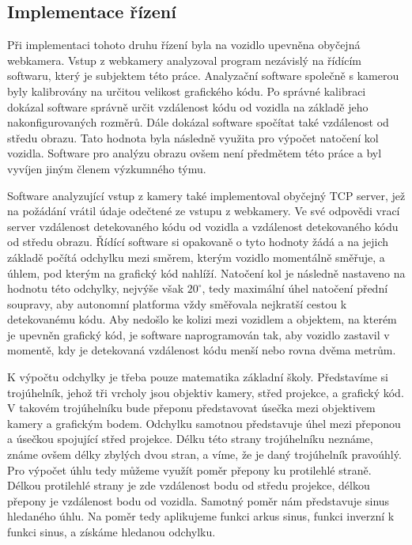 \documentclass[czech, bachelor]{diploma}
\begin{document}
\subsection{Implementace řízení}

Při implementaci tohoto druhu řízení byla na vozidlo upevněna obyčejná webkamera. Vstup z webkamery analyzoval program nezávislý
na řídícím softwaru, který je subjektem této práce. Analyzační software společně s kamerou byly kalibrovány na určitou velikost
grafického kódu. Po správné kalibraci dokázal software správně určit vzdálenost kódu od vozidla na základě jeho nakonfigurovaných
rozměrů. Dále dokázal software spočítat také vzdálenost od středu obrazu. Tato hodnota byla následně využita pro výpočet natočení
kol vozidla. Software pro analýzu obrazu ovšem není předmětem této práce a byl vyvíjen jiným členem výzkumného týmu.

Software analyzující vstup z kamery také implementoval obyčejný TCP server, jež na požádání vrátil údaje odečtené ze vstupu 
z webkamery. Ve své odpovědi vrací server vzdálenost detekovaného kódu od vozidla a vzdálenost detekovaného kódu od středu obrazu.
Řídící software si opakovaně o tyto hodnoty žádá a na jejich základě počítá odchylku mezi směrem, kterým vozidlo momentálně 
směřuje, a úhlem, pod kterým na grafický kód nahlíží. Natočení kol je následně nastaveno na hodnotu této odchylky, nejvýše však
$20^{\circ}$, tedy maximální úhel natočení přední soupravy, aby autonomní platforma vždy směřovala nejkratší cestou k detekovanému
kódu. Aby nedošlo ke kolizi mezi vozidlem a objektem, na kterém je upevněn grafický kód, je software naprogramován tak, aby 
vozidlo zastavil v momentě, kdy je detekovaná vzdálenost kódu menší nebo rovna dvěma metrům.

K výpočtu odchylky je třeba pouze matematika základní školy. Představíme si trojúhelník, jehož tři vrcholy jsou objektiv kamery, 
střed projekce, a grafický kód. V takovém trojúhelníku bude přeponu představovat úsečka mezi objektivem kamery a grafickým bodem.
Odchylku samotnou představuje úhel mezi přeponou a úsečkou spojující střed projekce. Délku této strany trojúhelníku neznáme, známe
ovšem délky zbylých dvou stran, a víme, že je daný trojúhelník pravoúhlý. Pro výpočet úhlu tedy můžeme využít poměr přepony ku 
protilehlé straně. Délkou protilehlé strany je zde vzdálenost bodu od středu projekce, délkou přepony je vzdálenost bodu 
od vozidla. Samotný poměr nám představuje sinus hledaného úhlu. Na poměr tedy aplikujeme funkci arkus sinus, funkci inverzní k 
funkci sinus, a získáme hledanou odchylku.
\end{document}
